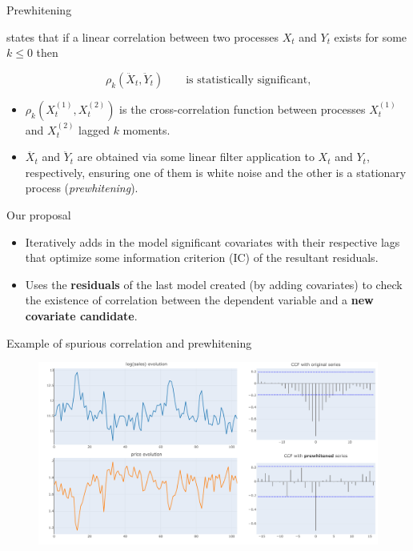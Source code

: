 \documentclass[10pt]{beamer}
\begin{document}
\begin{frame}{Prewhitening}

    \cite{cryer2008time} states that if a linear correlation between two processes $X_t$ and $Y_t$ exists for some $k\leq 0$ then
    
    \[ \rho_k(\ddot{X}_t, \ddot{Y}_t) \qquad \text{is statistically significant,} \] 

    \begin{itemize}
        \item $\rho_k(X_t^{(1)}, X_t^{(2)})$ is the cross-correlation function between processes $X_t^{(1)}$ and $X_t^{(2)}$ lagged $k$ moments.
        \item $\ddot{X_t}$ and $\ddot{Y}_t$ are obtained via some linear filter application to $X_t$ and $Y_t$, respectively, ensuring one of them is white noise and the other is a stationary process (\textit{prewhitening}).
    \end{itemize}

    \begin{block}{Our proposal}
        \vspace{0.2em}
        \begin{itemize}
            \item Iteratively adds in the model significant covariates with their respective lags that optimize some information criterion (IC) of the resultant residuals.
            \item Uses the \textbf{residuals} of the last model created (by adding covariates) to check the existence of correlation between the dependent variable and a \textbf{new covariate candidate}.
        \end{itemize}
    \end{block}

\end{frame}

\begin{frame}{Example of spurious correlation and prewhitening}
    \begin{figure}
        \includegraphics[scale=0.35]{example prewhitening.pdf}
    \end{figure}
    
\end{frame}
\end{document}
